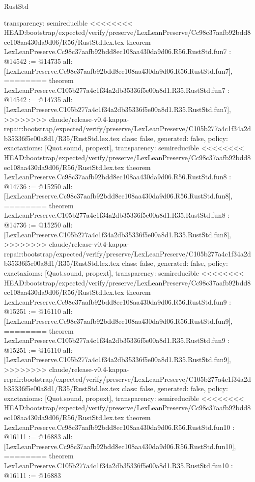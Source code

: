 \begin{lexlean}{RustStd}
\begin{coremodule}
{\begin{coremodule}
{{{{{{{{{{  transparency: semireducible
}
<<<<<<<< HEAD:bootstrap/expected/verify/preserve/LexLeanPreserve/Cc98c37aafb92bdd8ec108aa430da9d06/R56/RustStd.lex.tex
theorem LexLeanPreserve.Cc98c37aafb92bdd8ec108aa430da9d06.R56.RustStd.fun7 : @14542 := @14735 {
  all: [LexLeanPreserve.Cc98c37aafb92bdd8ec108aa430da9d06.R56.RustStd.fun7],
========
theorem LexLeanPreserve.C105b277a4c1f34a2db35336f5e00a8d1.R35.RustStd.fun7 : @14542 := @14735 {
  all: [LexLeanPreserve.C105b277a4c1f34a2db35336f5e00a8d1.R35.RustStd.fun7],
>>>>>>>> claude/release-v0.4-kappa-repair:bootstrap/expected/verify/preserve/LexLeanPreserve/C105b277a4c1f34a2db35336f5e00a8d1/R35/RustStd.lex.tex
  class: false,
  generated: false,
  policy: exact{axioms: [Quot.sound, propext]},
  transparency: semireducible
}
<<<<<<<< HEAD:bootstrap/expected/verify/preserve/LexLeanPreserve/Cc98c37aafb92bdd8ec108aa430da9d06/R56/RustStd.lex.tex
theorem LexLeanPreserve.Cc98c37aafb92bdd8ec108aa430da9d06.R56.RustStd.fun8 : @14736 := @15250 {
  all: [LexLeanPreserve.Cc98c37aafb92bdd8ec108aa430da9d06.R56.RustStd.fun8],
========
theorem LexLeanPreserve.C105b277a4c1f34a2db35336f5e00a8d1.R35.RustStd.fun8 : @14736 := @15250 {
  all: [LexLeanPreserve.C105b277a4c1f34a2db35336f5e00a8d1.R35.RustStd.fun8],
>>>>>>>> claude/release-v0.4-kappa-repair:bootstrap/expected/verify/preserve/LexLeanPreserve/C105b277a4c1f34a2db35336f5e00a8d1/R35/RustStd.lex.tex
  class: false,
  generated: false,
  policy: exact{axioms: [Quot.sound, propext]},
  transparency: semireducible
}
<<<<<<<< HEAD:bootstrap/expected/verify/preserve/LexLeanPreserve/Cc98c37aafb92bdd8ec108aa430da9d06/R56/RustStd.lex.tex
theorem LexLeanPreserve.Cc98c37aafb92bdd8ec108aa430da9d06.R56.RustStd.fun9 : @15251 := @16110 {
  all: [LexLeanPreserve.Cc98c37aafb92bdd8ec108aa430da9d06.R56.RustStd.fun9],
========
theorem LexLeanPreserve.C105b277a4c1f34a2db35336f5e00a8d1.R35.RustStd.fun9 : @15251 := @16110 {
  all: [LexLeanPreserve.C105b277a4c1f34a2db35336f5e00a8d1.R35.RustStd.fun9],
>>>>>>>> claude/release-v0.4-kappa-repair:bootstrap/expected/verify/preserve/LexLeanPreserve/C105b277a4c1f34a2db35336f5e00a8d1/R35/RustStd.lex.tex
  class: false,
  generated: false,
  policy: exact{axioms: [Quot.sound, propext]},
  transparency: semireducible
}
<<<<<<<< HEAD:bootstrap/expected/verify/preserve/LexLeanPreserve/Cc98c37aafb92bdd8ec108aa430da9d06/R56/RustStd.lex.tex
theorem LexLeanPreserve.Cc98c37aafb92bdd8ec108aa430da9d06.R56.RustStd.fun10 : @16111 := @16883 {
  all: [LexLeanPreserve.Cc98c37aafb92bdd8ec108aa430da9d06.R56.RustStd.fun10],
========
theorem LexLeanPreserve.C105b277a4c1f34a2db35336f5e00a8d1.R35.RustStd.fun10 : @16111 := @16883 {
}}}}}}}}}}}}}}
\end{coremodule}}
\end{coremodule}
\end{lexlean}
